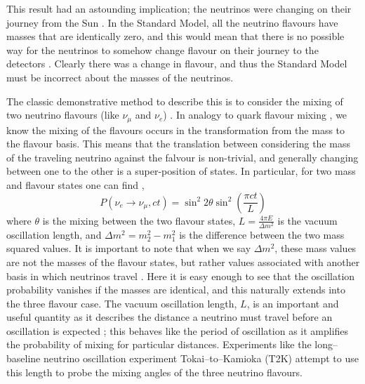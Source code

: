 This result had an astounding implication; the neutrinos were changing on their journey from the Sun \cite{sno}. In the Standard Model, all the neutrino flavours have masses that are identically zero, and this would mean that there is no possible way for the neutrinos to somehow change flavour on their journey to the detectors \cite{solar_nu}. Clearly there was a change in flavour, and thus the Standard Model must be incorrect about the masses of the neutrinos.

The classic demonstrative method to describe this is to consider the mixing of two neutrino flavours (like $\nu_{\mu}$ and $\nu_{e}$) \cite{solar_nu}. In analogy to quark flavour mixing \cite{pdg_ckm}, we know the mixing of the flavours occurs in the transformation from the mass to the flavour basis. This means that the translation between considering the mass of the traveling neutrino against the falvour is non-trivial, and generally changing between one to the other is a super-position of states. In particular, for two mass and flavour states one can find \cite{solar_nu},
\begin{equation}
  P(\nu_{e} \to \nu_{\mu}, ct) = \sin^{2}2\theta\sin^{2}\left(\frac{\pi ct}{L}\right)
\end{equation}
where $\theta$ is the mixing between the two flavour states, $L = \frac{4\pi E}{\Delta m^{2}}$ is the vacuum oscillation length, and $\Delta m^{2} = m_{2}^{2} - m_{1}^{2}$ is the difference between the two mass squared values. It is important to note that when we say $\Delta m^{2}$, these mass values are not the masses of the flavour states, but rather values associated with another basis in which neutrinos travel \cite{pdg_ckm}. Here it is easy enough to see that the oscillation probability vanishes if the masses are identical, and this naturally extends into the three flavour case. The vacuum oscillation length, $L$, is an important and useful quantity as it describes the distance a neutrino must travel before an oscillation is expected \cite{solar_nu}; this behaves like the period of oscillation as it amplifies the probability of mixing for particular distances. Experiments like the long--baseline neutrino oscillation experiment Tokai--to--Kamioka (T2K) attempt to use this length to probe the mixing angles of the three neutrino flavours. 

